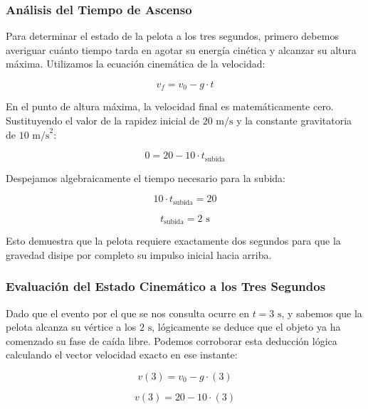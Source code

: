 \documentclass[12pt, a4paper]{article}
\begin{document}
\subsubsection*{Análisis del Tiempo de Ascenso}

Para determinar el estado de la pelota a los tres segundos, primero debemos averiguar cuánto tiempo tarda en agotar su energía cinética y alcanzar su altura máxima. Utilizamos la ecuación cinemática de la velocidad:

\begin{equation}
v_f = v_0 - g \cdot t
\end{equation}

En el punto de altura máxima, la velocidad final es matemáticamente cero. Sustituyendo el valor de la rapidez inicial de $20 \text{ m/s}$ y la constante gravitatoria de $10 \text{ m/s}^2$:

\begin{equation}
0 = 20 - 10 \cdot t_{\text{subida}}
\end{equation}

Despejamos algebraicamente el tiempo necesario para la subida:

\begin{equation}
10 \cdot t_{\text{subida}} = 20
\end{equation}

\begin{equation}
t_{\text{subida}} = 2 \text{ s}
\end{equation}

Esto demuestra que la pelota requiere exactamente dos segundos para que la gravedad disipe por completo su impulso inicial hacia arriba.

\subsubsection*{Evaluación del Estado Cinemático a los Tres Segundos}

Dado que el evento por el que se nos consulta ocurre en $t = 3 \text{ s}$, y sabemos que la pelota alcanza su vértice a los $2 \text{ s}$, lógicamente se deduce que el objeto ya ha comenzado su fase de caída libre. Podemos corroborar esta deducción lógica calculando el vector velocidad exacto en ese instante:

\begin{equation}
v(3) = v_0 - g \cdot (3)
\end{equation}

\begin{equation}
v(3) = 20 - 10 \cdot (3)
\end{equation}
\end{document}
